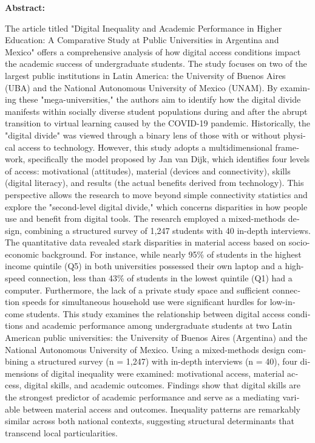 \begin{tcolorbox}[colback=brown!8!white,colframe=brown!8!white,boxrule=0pt,arc=2pt,left=4pt,right=4pt,top=3pt,bottom=3pt,before skip=4pt,after skip=4pt]
\begin{otherlanguage}{english}
\sffamily\small \textbf{Abstract:} 
     
     The article titled "Digital Inequality and Academic Performance in Higher Education: A Comparative Study at Public Universities in Argentina and Mexico" offers a comprehensive analysis of how digital access conditions impact the academic success of undergraduate students. The study focuses on two of the largest public institutions in Latin America: the University of Buenos Aires (UBA) and the National Autonomous University of Mexico (UNAM). By examining these "mega-universities," the authors aim to identify how the digital divide manifests within socially diverse student populations during and after the abrupt transition to virtual learning caused by the COVID-19 pandemic.
Historically, the "digital divide" was viewed through a binary lens of those with or without physical access to technology. However, this study adopts a multidimensional framework, specifically the model proposed by Jan van Dijk, which identifies four levels of access: motivational (attitudes), material (devices and connectivity), skills (digital literacy), and results (the actual benefits derived from technology). This perspective allows the research to move beyond simple connectivity statistics and explore the "second-level digital divide," which concerns disparities in how people use and benefit from digital tools.
The research employed a mixed-methods design, combining a structured survey of 1,247 students with 40 in-depth interviews. The quantitative data revealed stark disparities in material access based on socio-economic background. For instance, while nearly 95\% of students in the highest income quintile (Q5) in both universities possessed their own laptop and a high-speed connection, less than 43\% of students in the lowest quintile (Q1) had a computer. Furthermore, the lack of a private study space and sufficient connection speeds for simultaneous household use were significant hurdles for low-income students.
This study examines the relationship between digital access conditions and academic performance among undergraduate students at two Latin American public universities: the University of Buenos Aires (Argentina) and the National Autonomous University of Mexico. Using a mixed-methods design combining a structured survey (n = 1,247) with in-depth interviews (n = 40), four dimensions of digital inequality were examined: motivational access, material access, digital skills, and academic outcomes. Findings show that digital skills are the strongest predictor of academic performance and serve as a mediating variable between material access and outcomes. Inequality patterns are remarkably similar across both national contexts, suggesting structural determinants that transcend local particularities.
    

\end{otherlanguage}
\end{tcolorbox}
